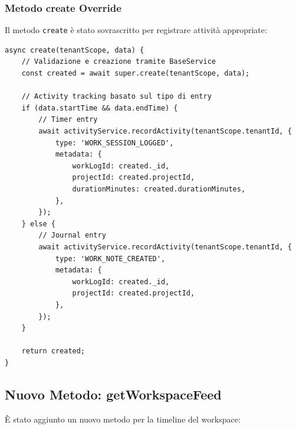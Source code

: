 \documentclass[11pt,a4paper]{article}
\begin{document}
\subsubsection{Metodo create Override}

Il metodo \texttt{create} è stato sovrascritto per registrare attività appropriate:

\begin{lstlisting}[caption=create con Activity Tracking]
async create(tenantScope, data) {
    // Validazione e creazione tramite BaseService
    const created = await super.create(tenantScope, data);
    
    // Activity tracking basato sul tipo di entry
    if (data.startTime && data.endTime) {
        // Timer entry
        await activityService.recordActivity(tenantScope.tenantId, {
            type: 'WORK_SESSION_LOGGED',
            metadata: {
                workLogId: created._id,
                projectId: created.projectId,
                durationMinutes: created.durationMinutes,
            },
        });
    } else {
        // Journal entry
        await activityService.recordActivity(tenantScope.tenantId, {
            type: 'WORK_NOTE_CREATED',
            metadata: {
                workLogId: created._id,
                projectId: created.projectId,
            },
        });
    }
    
    return created;
}
\end{lstlisting}

\subsection{Nuovo Metodo: getWorkspaceFeed}

È stato aggiunto un nuovo metodo per la timeline del workspace:
\end{document}
